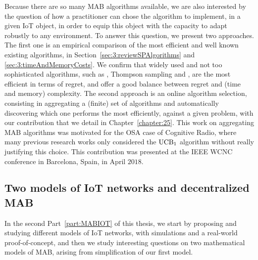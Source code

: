 %
Because there are so many MAB algorithms available, we are also interested by the question of how a practitioner can chose the algorithm to implement, in a given IoT object, in order to equip this object with the capacity to adapt robustly to any environment.
To answer this question, we present two approaches.
The first one is an empirical comparison of the most efficient and well known existing algorithms, in Section~\ref{sec:3:reviewSPAlgorithms} and \ref{sec:3:timeAndMemoryCosts}.
We confirm that widely used and not too sophisticated algorithms, such as \UCB{} \cite{Auer02}, Thompson sampling \cite{Thompson33} and \klUCB{} \cite{KLUCBJournal}, are the most efficient in terms of regret, and offer a good balance between regret and (time and memory) complexity.
The second approach is an online algorithm selection, consisting in aggregating a (finite) set of algorithms and automatically discovering which one performs the most efficiently, against a given problem, with our contribution \Aggr{} that we detail in Chapter~\ref{chapter:25}.
This work on aggregating MAB algorithms was motivated for the OSA case of Cognitive Radio, where many previous research works only considered the $\mathrm{UCB}_1$ algorithm without really justifying this choice.
This contribution was presented at the IEEE WCNC conference in Barcelona, Spain, in April $2018$.


\subsection{Two models of IoT networks and decentralized MAB}

In the second Part~\ref{part:MABIOT} of this thesis, we start by proposing and studying different models of IoT networks, with simulations and a real-world proof-of-concept, and then we study interesting questions on two mathematical models of MAB, arising from simplification of our first model.


